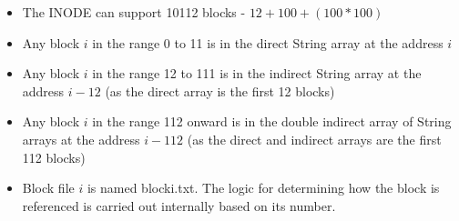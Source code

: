 \documentclass{article}
\begin{document}
\begin{itemize}
	\item The INODE can support 10112 blocks - $12+100+(100*100)$
	\item Any block $i$ in the range 0 to 11 is in the direct String array at the address $i$
	\item Any block $i$ in the range 12 to 111 is in the indirect String array at the address $i-12$ (as the direct array is the first 12 blocks)
	\item Any block $i$ in the range 112 onward is in the double indirect array of String arrays at the address $i-112$ (as the direct and indirect arrays are the first 112 blocks)
	\item Block file $i$ is named blocki.txt. The logic for determining how the block is referenced is carried out internally based on its number.
\end{itemize}
\end{document}

